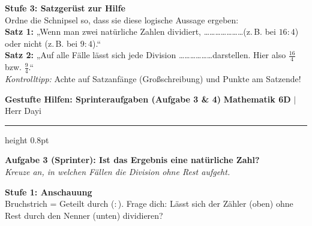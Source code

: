 \documentclass[a4paper, 10pt]{article}
\begin{document}
\begin{tcolorbox}[colback=step3Bg, colframe=step3Border, arc=1.8mm, boxrule=0.7pt, left=3mm, right=3mm, top=1.8mm, bottom=1.8mm]
    {\color{step3Text}\small\bfseries\faPenNib\enskip Stufe 3: Satzgerüst zur Hilfe}\\[1mm]
    {\footnotesize
    Ordne die Schnipsel so, dass sie diese logische Aussage ergeben:\\[0.5mm]
    \textbf{Satz 1:} „Wenn man zwei natürliche Zahlen dividiert, \dots\dots\dots\dots\dots\dots\dots (z.\,B. bei $16:4$) oder nicht (z.\,B. bei $9:4$).“\\[0.8mm]
    \textbf{Satz 2:} „Auf alle Fälle lässt sich jede Division \dots\dots\dots\dots\dots\dots darstellen. Hier also $\frac{16}{4}$ bzw. $\frac{9}{4}$.“\\[0.5mm]
    \textit{Kontrolltipp:} Achte auf Satzanfänge (Großschreibung) und Punkte am Satzende!
    }
\end{tcolorbox}

\newpage


\noindent
{\color{primaryBlue}\bfseries\large \faRunning\enskip Gestufte Hilfen: Sprinteraufgaben (Aufgabe 3 \& 4)}
\hfill
{\footnotesize\color{primaryBlue!80} \textbf{Mathematik 6D} \quad$|$\quad Herr Dayi}
\vspace{1.5mm}
{\color{primaryBlue!40}\hrule height 0.8pt}
\vspace{3mm}

\begin{tcolorbox}[enhanced, colback=lvlGreen!5, colframe=lvlGreen!60, arc=2mm, boxrule=0.8pt, left=3mm, right=3mm, top=2mm, bottom=2mm]
    {\bfseries\color{lvlGreen} \faStar\enskip Aufgabe 3 (Sprinter): Ist das Ergebnis eine natürliche Zahl?}\\[1mm]
    {\footnotesize\textit{Kreuze an, in welchen Fällen die Division ohne Rest aufgeht.}}
\end{tcolorbox}

\vspace{1.2mm}

\begin{tcolorbox}[colback=step1Bg, colframe=step1Border, arc=1.8mm, boxrule=0.7pt, left=3mm, right=3mm, top=1.8mm, bottom=1.8mm]
    {\color{step1Text}\small\bfseries\faEye\enskip Stufe 1: Anschauung}\\[1mm]
    {\footnotesize Bruchstrich = Geteilt durch ($:$). Frage dich: Lässt sich der Zähler (oben) ohne Rest durch den Nenner (unten) dividieren?}
\end{tcolorbox}
\end{document}
